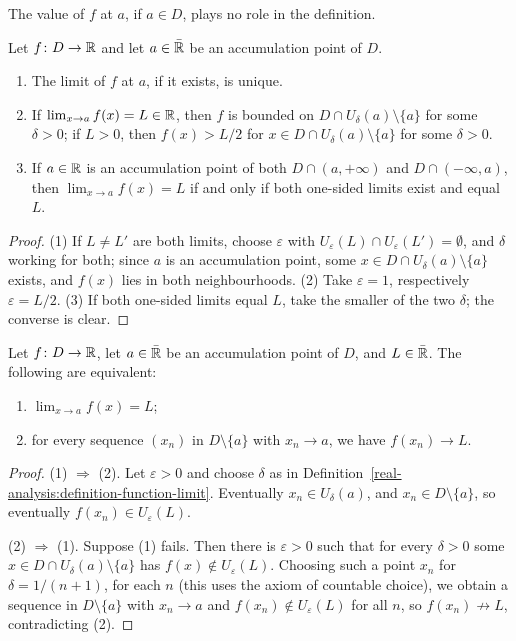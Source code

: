 The value of $f$ at $a$, if $a \in D$, plays no role in the definition.

\begin{proposition}\label{real-analysis:proposition-function-limit-basic}
Let $f \colon D \to \mathbb{R}$ and let $a \in \bar{\mathbb{R}}$ be an accumulation point of $D$.
\begin{enumerate}
\item The limit of $f$ at $a$, if it exists, is unique.
\item If $\lim_{x \to a}f(x) = L \in \mathbb{R}$, then $f$ is bounded on $D \cap U_\delta(a) \setminus \{a\}$ for some $\delta > 0$; if $L > 0$, then $f(x) > L/2$ for $x \in D \cap U_\delta(a) \setminus \{a\}$ for some $\delta > 0$.
\item If $a \in \mathbb{R}$ is an accumulation point of both $D \cap (a, +\infty)$ and $D \cap (-\infty, a)$, then $\lim_{x \to a}f(x) = L$ if and only if both one-sided limits exist and equal $L$.
\end{enumerate}
\end{proposition}

\begin{proof}
(1) If $L \neq L'$ are both limits, choose $\varepsilon$ with $U_\varepsilon(L) \cap U_\varepsilon(L') = \emptyset$, and $\delta$ working for both; since $a$ is an accumulation point, some $x \in D \cap U_\delta(a) \setminus \{a\}$
exists, and $f(x)$ lies in both neighbourhoods. (2) Take $\varepsilon = 1$, respectively $\varepsilon = L/2$. (3) If both one-sided limits equal $L$, take the smaller of the two $\delta$; the converse is clear.
\end{proof}

\begin{theorem}\label{real-analysis:theorem-sequential-limits}
Let $f \colon D \to \mathbb{R}$, let $a \in \bar{\mathbb{R}}$ be an accumulation point of $D$, and $L \in \bar{\mathbb{R}}$. The following are equivalent:
\begin{enumerate}
\item $\lim_{x \to a}f(x) = L$;
\item for every sequence $(x_n)$ in $D \setminus \{a\}$ with $x_n \to a$, we have $f(x_n) \to L$.
\end{enumerate}
\end{theorem}

\begin{proof}
(1) $\Rightarrow$ (2). Let $\varepsilon > 0$ and choose $\delta$ as in Definition~\ref{real-analysis:definition-function-limit}. Eventually $x_n \in U_\delta(a)$, and $x_n \in D \setminus \{a\}$, so eventually
$f(x_n) \in U_\varepsilon(L)$.

(2) $\Rightarrow$ (1). Suppose (1) fails. Then there is $\varepsilon > 0$ such that for every $\delta > 0$ some $x \in D \cap U_\delta(a) \setminus \{a\}$ has $f(x) \notin U_\varepsilon(L)$. Choosing such a point $x_n$ for
$\delta = 1/(n + 1)$, for each $n$ (this uses the axiom of countable choice), we obtain a sequence in $D \setminus \{a\}$ with $x_n \to a$ and $f(x_n) \notin U_\varepsilon(L)$ for all $n$, so $f(x_n) \not\to L$,
contradicting (2).
\end{proof}

